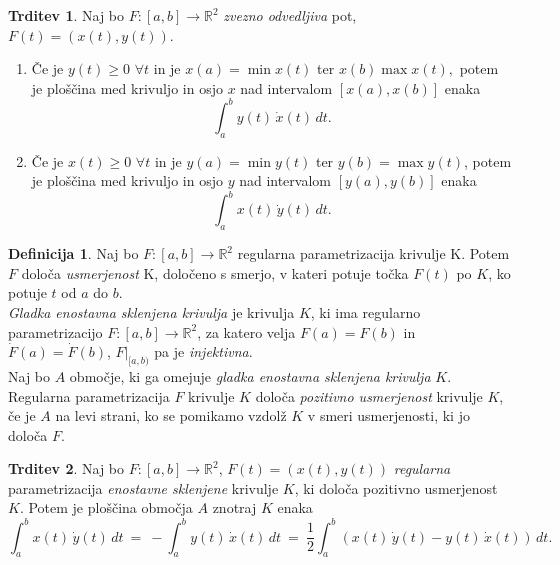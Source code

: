 \documentclass[11pt]{article}
\newcommand{\R}{\mathbb{R}}
\theoremstyle{definition}
\newtheorem{definicija}{Definicija}[section]
\theoremstyle{definition}
\newtheorem{trditev}{Trditev}[section]
\theoremstyle{definition}
\theoremstyle{theorem}
\begin{document}
\begin{trditev}

Naj bo $F: [a, b] \rightarrow \R^2$ \textit{zvezno odvedljiva} pot, $F(t) = (x(t), y(t))$.
\begin{enumerate}
	\item Če je $y(t) \geq 0$ $\forall t$ in je $x(a) = \min{x(t)}$ ter $x(b) \max{x(t)},$ potem je ploščina med krivuljo in osjo $x$ nad intervalom $[x(a), x(b)]$ enaka
	$$\int_a^b y(t)\,\dot{x}(t)\,dt.$$
	
	\item Če je $x(t) \geq 0 $ $\forall t$ in je $y(a) = \min{y(t)}$ ter $y(b) = \max{y(t)}$, potem je ploščina med krivuljo in osjo $y$ nad intervalom $[y(a), y(b)]$ enaka
	$$\int_a^b x(t)\,\dot{y}(t)\,dt.$$
\end{enumerate}
\end{trditev}
\vspace{0.5cm}

\begin{definicija}

Naj bo $F:[a, b] \rightarrow \mathbb{R}^2$ regularna parametrizacija krivulje K. Potem $F$ določa \textit{usmerjenost} K, določeno s smerjo, v kateri potuje točka $F(t)$ po $K$, ko potuje $t$ od $a$ do $b$. \\

\textit{Gladka enostavna sklenjena krivulja} je krivulja $K$, ki ima regularno parametrizacijo $F:[a, b] \rightarrow \mathbb{R}^2$, za katero velja $F(a) = F(b)$ in $\dot{F}(a) = \dot{F}(b)$, $F |_{[a, b)}$ pa je \textit{injektivna}. \\

Naj bo $A$ območje, ki ga omejuje \textit{gladka enostavna sklenjena krivulja} $K$. Regularna parametrizacija $F$ krivulje $K$ določa \textit{pozitivno usmerjenost} krivulje $K$, če je $A$ na levi strani, ko se pomikamo vzdolž $K$ v smeri usmerjenosti, ki jo določa $F$.

\end{definicija}
\vspace{0.5cm}

\begin{trditev}

Naj bo $F: [a, b] \rightarrow \R^2$, $F(t) = (x(t), y(t))$ \textit{regularna} parametrizacija \textit{enostavne sklenjene} krivulje $K$, ki določa pozitivno usmerjenost $K$. Potem je ploščina območja $A$ znotraj $K$ enaka
$$\int_a^b x(t)\,\dot{y}(t)\,dt ~=~ -\int_a^b y(t)\,\dot{x}(t)\,dt ~=~ \frac{1}{2} \int_a^b (x(t)\,\dot{y}(t) - y(t)\,\dot{x}(t))\,dt.$$

\end{trditev}
\vspace{0.5cm}
\end{document}
